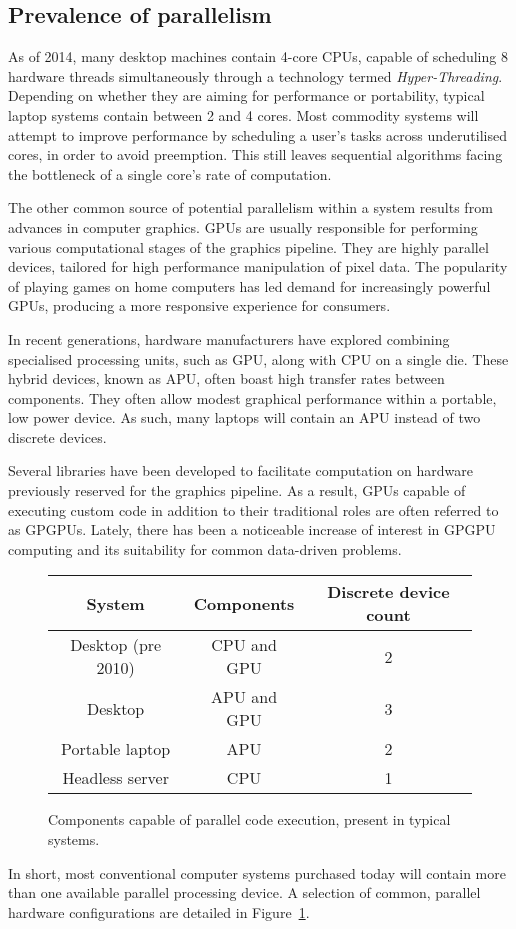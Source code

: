 \subsection{Prevalence of parallelism}
As of 2014, many desktop machines contain 4-core \acp{CPU}, capable of scheduling 8 hardware threads simultaneously through a technology termed \emph{Hyper-Threading}\cite{marr2002hyper}.
Depending on whether they are aiming for performance or portability, typical laptop systems contain between 2 and 4 cores.
Most commodity systems will attempt to improve performance by scheduling a user's tasks across underutilised cores, in order to avoid preemption. This still leaves sequential algorithms facing the bottleneck of a single core's rate of computation.

The other common source of potential parallelism within a system results from advances in computer graphics.
\acp{GPU} are usually responsible for performing various computational stages of the graphics pipeline. They are highly parallel devices, tailored for high performance manipulation of pixel data. The popularity of playing games on home computers has led demand for increasingly powerful \acp{GPU}, producing a more responsive experience for consumers.

In recent generations, hardware manufacturers have explored combining specialised processing units, such as \ac{GPU}, along with \ac{CPU} on a single die. These hybrid devices, known as \ac{APU}, often boast high transfer rates between components. They often allow modest graphical performance within a portable, low power device. As such, many laptops will contain an \ac{APU} instead of two discrete devices.

Several libraries have been developed to facilitate computation on hardware previously reserved for the graphics pipeline. As a result, \acp{GPU} capable of executing custom code in addition to their traditional roles are often referred to as \acp{GPGPU}.
Lately, there has been a noticeable increase of interest in \ac{GPGPU} computing and its suitability for common data-driven problems.

\begin{figure}
\begin{center}
  \begin{tabular}{ | c | c | c |}
    \hline
    System & Components & Discrete device count \\ \hline
    Desktop (pre 2010) & \ac{CPU} and \ac{GPU} & 2 \\ \hline
    Desktop & \ac{APU} and \ac {GPU} & 3 \\ \hline
    Portable laptop & \ac{APU} & 2 \\ \hline
    Headless server & \ac{CPU} & 1 \\ \hline
    \end{tabular}
  \caption{Components capable of parallel code execution, present in typical systems.}
  \label{fig:par_table}
\end{center}
\end{figure}

In short, most conventional computer systems purchased today will contain more than one available parallel processing device. A selection of common, parallel hardware configurations are detailed in Figure~\ref{fig:par_table}.
